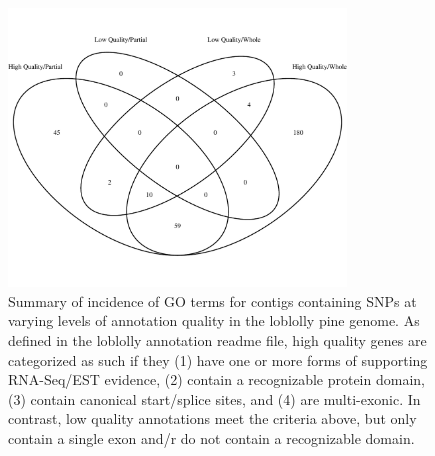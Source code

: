 \documentclass[smallextended]{svjour3}
\begin{document}
\begin{figure}[ht]
\centering
\includegraphics[width=0.8\textwidth]{snp_venn}
\caption{Summary of incidence of GO terms for contigs containing SNPs at varying
  levels of annotation quality in the loblolly pine genome. As defined in the
  loblolly annotation readme file, high quality genes are categorized as such if
  they (1) have one or more forms of supporting RNA-Seq/EST evidence, (2)
  contain a recognizable protein domain, (3) contain canonical start/splice
  sites, and (4) are multi-exonic. In contrast, low quality annotations meet the
  criteria above, but only contain a single exon and/r do not contain a
  recognizable domain.}
\label{f:snp_venn}
\end{figure}

\clearpage
\end{document}
